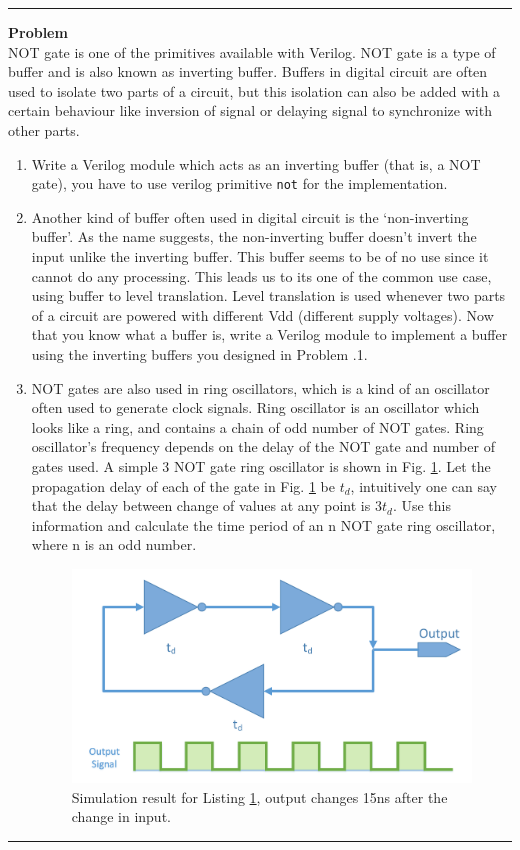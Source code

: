 \documentclass[a4paper,10pt]{article}
\theoremstyle{mytheor}
\newcounter{problemNumber}
\newcommand {
  \insertProblem}[1]{
  \vspace{0.5cm}
  \hrule
  \vspace{0.3cm}

  {\color{greatblue}\textbf{\large{Problem \theproblemNumber}}}
  \vspace{2pt}\\#1

  \addtocounter{problemNumber}{1}
  \vspace{0.2cm}
  \hrule  
  \vspace{0.5cm}
}
\begin{document}
\insertProblem { NOT gate is one of the primitives available with
  Verilog. NOT gate is a type of buffer and is also known as inverting
  buffer. Buffers in digital circuit are often used to isolate two
  parts of a circuit, but this isolation can also be added with a
  certain behaviour like inversion of signal or delaying signal to
  synchronize with other parts.
  
  \begin {enumerate}
  \item Write a Verilog module which acts as an inverting buffer (that
    is, a NOT gate), you have to use verilog primitive
    \lstinline[style=verilog-inline-style]{not} for the
    implementation.
  \item Another kind of buffer often used in digital circuit is the
    `non-inverting buffer'. As the name suggests, the non-inverting
    buffer doesn't invert the input unlike the inverting buffer. This
    buffer seems to be of no use since it cannot do any
    processing. This leads us to its one of the common use case, using
    buffer to level translation. Level translation is used whenever
    two parts of a circuit are powered with different Vdd (different
    supply voltages). Now that you know what a buffer is, write a
    Verilog module to implement a buffer using the inverting buffers
    you designed in Problem {\theproblemNumber}.1.
  \item NOT gates are also used in ring oscillators, which is a kind
    of an oscillator often used to generate clock signals. Ring
    oscillator is an oscillator which looks like a ring, and contains
    a chain of odd number of NOT gates. Ring oscillator's frequency
    depends on the delay of the NOT gate and number of gates used. A
    simple 3 NOT gate ring oscillator is shown in
    Fig. \ref{ring-oscillator}. Let the propagation delay of each of
    the gate in Fig. \ref{ring-oscillator} be $t_d$, intuitively one
    can say that the delay between change of values at any point is
    $3t_d$. Use this information and calculate the time period of an n
    NOT gate ring oscillator, where n is an odd number.

    \begin{figure}[!h] \centering  
      \includegraphics[width=0.5\linewidth]{./resources/ringOscillator.pdf}
      \caption{Simulation result for Listing \ref{ring-oscillator}, output changes 15ns after the change in input.} 
      \label{ring-oscillator}
    \end{figure}


\end{enumerate}}
\end{document}
